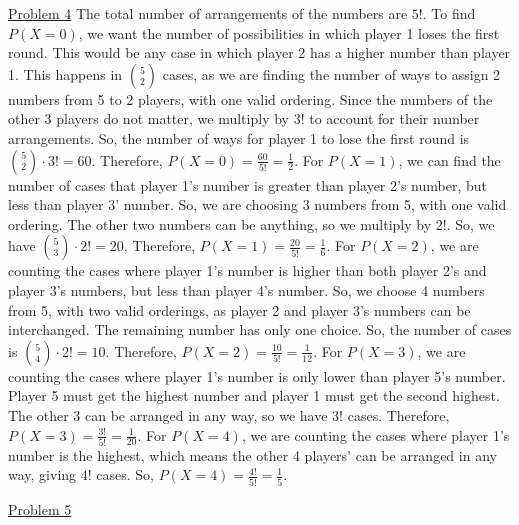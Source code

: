 \documentclass{exam}
\begin{document}
\underline{Problem 4}
\newline
\newline
The total number of arrangements of the numbers are $5!$. To find $P(X=0)$, we want the number of possibilities in which player 1 loses the first round. This would be any case in which player 2 has a higher number than player 1. This happens in $\binom{5}{2}$ cases, as we are finding the number of ways to assign 2 numbers from 5 to 2 players, with one valid ordering. Since the numbers of the other 3 players do not matter, we multiply by $3!$ to account for their number arrangements. So, the number of ways for player 1 to lose the first round is $\binom{5}{2}\cdot3!=60$. Therefore, $P(X=0)=\frac{60}{5!}=\frac{1}{2}$. For $P(X=1)$, we can find the number of cases that player 1's number is greater than player 2's number, but less than player 3' number. So, we are choosing 3 numbers from 5, with one valid ordering. The other two numbers can be anything, so we multiply by $2!$. So, we have $\binom{5}{3}\cdot2!=20$, Therefore, $P(X=1)=\frac{20}{5!}=\frac{1}{6}$. For $P(X=2)$, we are counting the cases where player 1's number is higher than both player 2's and player 3's numbers, but less than player 4's number. So, we choose 4 numbers from 5, with two valid orderings, as player 2 and player 3's numbers can be interchanged. The remaining number has only one choice. So, the number of cases is $\binom{5}{4}\cdot2!=10$. Therefore, $P(X=2)=\frac{10}{5!}=\frac{1}{12}$. For $P(X=3)$, we are counting the cases where player 1's number is only lower than player 5's number. Player 5 must get the highest number and player 1 must get the second highest. The other 3 can be arranged in any way, so we have $3!$ cases. Therefore, $P(X=3)=\frac{3!}{5!}=\frac{1}{20}$. For $P(X=4)$, we are counting the cases where player 1's number is the highest, which means the other 4 players' can be arranged in any way, giving $4!$ cases. So, $P(X=4)=\frac{4!}{5!}=\frac{1}{5}$. 
\newline

\underline{Problem 5}
\newline
{}
\end{document}

